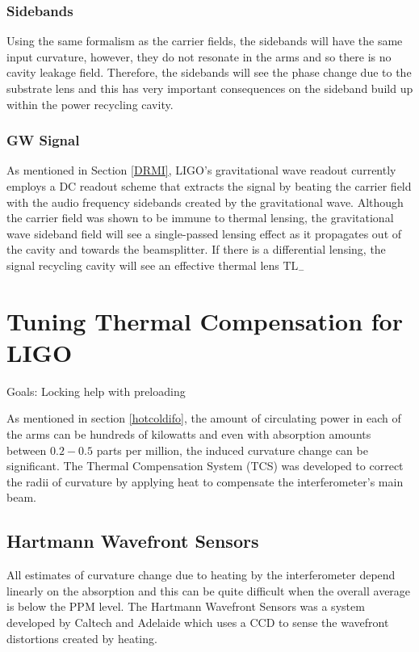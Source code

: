 		\subsubsection{Sidebands}
		Using the same formalism as the carrier fields, the sidebands will have the same input curvature, however, they do not resonate in the arms and so there is no cavity leakage field.  Therefore, the sidebands will see the phase change due to the substrate lens and this has very important consequences on the sideband build up within the power recycling cavity.
		
		\subsubsection{GW Signal}
		As mentioned in Section \ref{DRMI}, LIGO's gravitational wave readout currently employs a DC readout scheme that extracts the signal by beating the carrier field with the audio frequency sidebands created by the gravitational wave.  Although the carrier field was shown to be immune to thermal lensing, the gravitational wave sideband field will see a single-passed lensing effect as it propagates out of the cavity and towards the beamsplitter.  If there is a differential lensing, the signal recycling cavity will see an effective thermal lens $\text{TL}_{-}$
	
	\section{Tuning Thermal Compensation for LIGO}
	Goals: Locking help with preloading
	
	\cite{Lawrence_TCS}
	
	\cite{AWC_current}
	
	As mentioned in section \ref{hotcoldifo}, the amount of circulating power in each of the arms can be hundreds of kilowatts and even with absorption amounts between $0.2-0.5$ parts per million, the induced curvature change can be significant.  The Thermal Compensation System (TCS) was developed to correct the radii of curvature by applying heat to compensate the interferometer's main beam.

	\subsection{Hartmann Wavefront Sensors}
	All estimates of curvature change due to heating by the interferometer depend linearly on the absorption and this can be quite difficult when the overall average is below the PPM level.  The Hartmann Wavefront Sensors was a system developed by Caltech and Adelaide which uses a CCD to sense the wavefront distortions created by heating.
	
